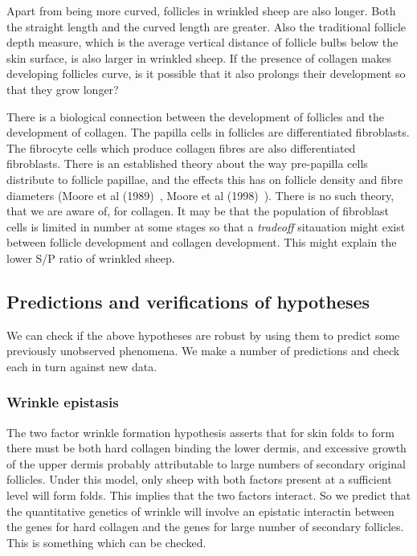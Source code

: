\documentclass[titlepage]{article}  %
\begin{document}
Apart from being more curved, follicles in wrinkled sheep are also longer. Both the straight length and the curved length are greater. Also the traditional follicle depth measure, which is the average vertical distance of follicle bulbs below the skin surface, is also larger in wrinkled sheep.  If the presence of collagen makes developing follicles curve, is it possible that it also prolongs their development so that they grow longer? 

There is a biological connection between the development of follicles and the development of collagen. The papilla cells in follicles are differentiated fibroblasts. The fibrocyte cells which produce collagen fibres are also differentiated fibroblasts.  There is an established theory about the way pre-papilla cells distribute to follicle papillae, and the effects this has on follicle density and fibre diameters (Moore et al (1989)~\cite{moor:89}, Moore et al (1998)~\cite{moor:98}). There is no such theory, that we are aware of, for collagen. It may be that the population of fibroblast cells is limited in number at some stages so that a {\em tradeoff} sitauation might exist between follicle development and collagen development. This might explain the lower S/P ratio of wrinkled sheep.

\subsection{Predictions and verifications of hypotheses}
We can check if the above hypotheses are robust by using them to predict some previously unobserved phenomena. We make a number of predictions and check each in turn against new data.

\subsubsection{Wrinkle epistasis}
The two factor wrinkle formation hypothesis asserts that for skin folds to form there must be both hard collagen binding the lower dermis, and excessive growth of the upper dermis probably attributable to large numbers of secondary original follicles. Under this model, only sheep with both factors present at a sufficient level will form folds. This implies that the two factors interact. So we predict that the quantitative genetics of wrinkle will involve an epistatic interactin between the genes for hard collagen and the genes for large number of secondary follicles. This is something which can be checked.
\end{document}
